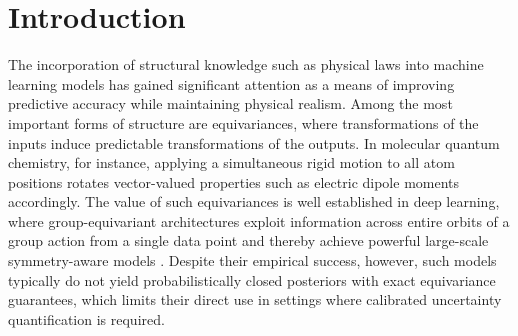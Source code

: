 \documentclass[11pt,a4paper]{article}
\begin{document}
\section{Introduction}
\label{sec:introduction}
The incorporation of structural knowledge such as physical laws into machine learning models has gained significant attention as a means of improving predictive accuracy while maintaining physical realism. Among the most important forms of structure are equivariances, where transformations of the inputs induce predictable transformations of the outputs. In molecular quantum chemistry, for instance, applying a simultaneous rigid motion to all atom positions rotates vector-valued properties such as electric dipole moments accordingly. The value of such equivariances is well established in deep learning, where group-equivariant architectures exploit information across entire orbits of a group action from a single data point and thereby achieve powerful large-scale symmetry-aware models \citep{cohen2016group,weiler20183d,thomas2018tensor,fuchs2020se,pmlr-v139-schutt21a,batzner20223,kovacs2023evaluation,satorras2021n}. Despite their empirical success, however, such models typically do not yield probabilistically closed posteriors with exact equivariance guarantees, which limits their direct use in settings where calibrated uncertainty quantification is required.
\end{document}
